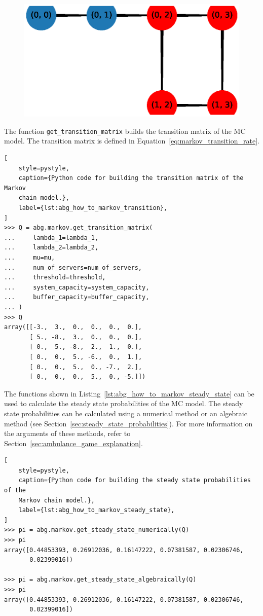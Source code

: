 \begin{figure}[H]
    \centering
    \includegraphics[width=\textwidth]{chapters/00_appendix/01_ambulance_game_library/Bin/visualise_markov.eps}
\end{figure}

The function \texttt{get\_transition\_matrix} builds the transition matrix
of the MC model.
The transition matrix is defined in Equation~\ref{eq:markov_transition_rate}.

\begin{lstlisting}[
    style=pystyle,
    caption={Python code for building the transition matrix of the Markov
    chain model.},
    label={lst:abg_how_to_markov_transition},
]
>>> Q = abg.markov.get_transition_matrix(
...     lambda_1=lambda_1,
...     lambda_2=lambda_2,
...     mu=mu,
...     num_of_servers=num_of_servers,
...     threshold=threshold,
...     system_capacity=system_capacity,
...     buffer_capacity=buffer_capacity,
... )
>>> Q
array([[-3.,  3.,  0.,  0.,  0.,  0.],
       [ 5., -8.,  3.,  0.,  0.,  0.],
       [ 0.,  5., -8.,  2.,  1.,  0.],
       [ 0.,  0.,  5., -6.,  0.,  1.],
       [ 0.,  0.,  5.,  0., -7.,  2.],
       [ 0.,  0.,  0.,  5.,  0., -5.]])

\end{lstlisting}

The functions shown in Listing~\ref{lst:abg_how_to_markov_steady_state} can be
used to calculate the steady state probabilities of the MC model.
The steady state probabilities can be calculated using a numerical method or
an algebraic method (see Section~\ref{sec:steady_state_probabilities}).
For more information on the arguments of these methods, refer to
Section~\ref{sec:ambulance_game_explanation}.

\newpage
\begin{lstlisting}[
    style=pystyle,
    caption={Python code for building the steady state probabilities of the
    Markov chain model.},
    label={lst:abg_how_to_markov_steady_state},
]
>>> pi = abg.markov.get_steady_state_numerically(Q)
>>> pi
array([0.44853393, 0.26912036, 0.16147222, 0.07381587, 0.02306746,
       0.02399016])

>>> pi = abg.markov.get_steady_state_algebraically(Q)
>>> pi
array([0.44853393, 0.26912036, 0.16147222, 0.07381587, 0.02306746,
       0.02399016])
    
\end{lstlisting}

